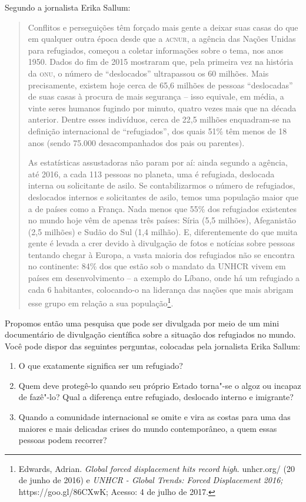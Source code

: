 \documentclass[12pt]{extarticle}
\begin{document}
Segundo a jornalista Erika Sallum:

\begin{quote}
Conflitos e perseguições têm forçado mais gente a deixar suas casas do
que em qualquer outra época desde que a \textsc{acnur}, a agência das Nações
Unidas para refugiados, começou a coletar informações sobre o tema, nos
anos 1950. Dados do fim de 2015 mostraram que, pela primeira vez na
história da \textsc{onu}, o número de ``deslocados'' ultrapassou os 60 milhões.
Mais precisamente, existem hoje cerca de 65,6 milhões de pessoas
``deslocadas'' de suas casas à procura de mais segurança -- isso
equivale, em média, a vinte seres humanos fugindo por minuto, quatro vezes
mais que na década anterior. Dentre esses indivíduos, cerca de 22,5 
milhões enquadram-se na definição internacional de ``refugiados'', dos
quais 51\% têm menos de 18 anos (sendo 75.000 desacompanhados dos pais
ou parentes).

As estatísticas assustadoras não param por aí: ainda segundo a agência,
até 2016, a cada 113 pessoas no planeta, uma é refugiada, deslocada
interna ou solicitante de asilo. Se contabilizarmos o número de
refugiados, deslocados internos e solicitantes de asilo, temos uma
população maior que a de países como a França. Nada menos que 55\% dos
refugiados existentes no mundo hoje vêm de apenas três países: Síria (5,5 milhões),
Afeganistão (2,5 milhões) e Sudão do Sul (1,4 milhão). E, diferentemente do que muita gente é levada a
crer devido à divulgação de fotos e notícias sobre pessoas tentando
chegar à Europa, a vasta maioria dos refugiados não se encontra no
continente: 84\% dos que estão sob o mandato da {UNHCR} vivem em países em
desenvolvimento -- a exemplo do Líbano, onde há um refugiado a cada 6
habitantes, colocando-o na liderança das nações que mais abrigam esse
grupo em relação a sua população\footnote{Edwards, Adrian. \emph{Global forced
  displacement hits record high}.
  {unhcr.org/} (20 de
  junho de 2016) e \emph{{UNHCR} - Global Trends: Forced Displacement 2016;}
  https://goo.gl/86CXwK; Acesso: 4 
  de julho de 2017.}. 
\end{quote}

Propomos então uma pesquisa que pode ser divulgada por meio de
um mini documentário de divulgação científica sobre a situação dos refugiados 
no mundo. Você pode dispor das seguintes perguntas, colocadas pela 
jornalista Erika Sallum:

\begin{enumerate}
\item O que exatamente significa ser um refugiado? 
\item Quem deve protegê-lo quando seu próprio Estado torna"-se o algoz 
ou incapaz de fazê"-lo? Qual a
diferença entre refugiado, deslocado interno e imigrante? 
\item Quando a comunidade internacional se omite e vira as
costas para uma das maiores e mais delicadas crises do mundo contemporâneo, a
quem essas pessoas podem recorrer?
\end{enumerate}
\end{document}
